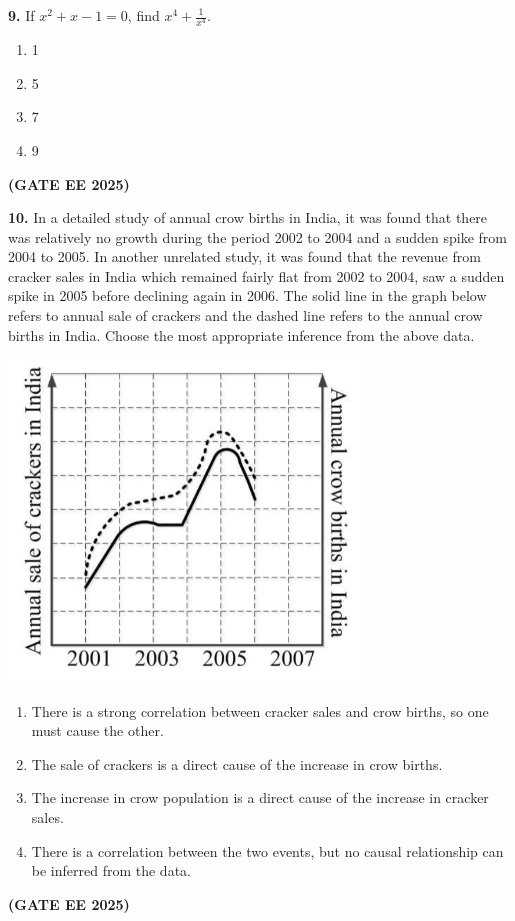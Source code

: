 \documentclass[journal,12pt,onecolumn]{IEEEtran}
\newcommand{\brak}[1]{(#1)}
\begin{document}
\noindent\textbf{9.} If $x^{2}+x-1=0$, find $x^4+\frac{1}{x^4}$.
\begin{enumerate}
    \item 1
    \item 5
    \item 7
    \item 9
\end{enumerate}
\hfill \textbf{\brak{GATE EE 2025}}

\noindent\textbf{10.} In a detailed study of annual crow births in India, it was found that there was relatively no growth during the period 2002 to 2004 and a sudden spike from 2004 to 2005. In another unrelated study, it was found that the revenue from cracker sales in India which remained fairly flat from 2002 to 2004, saw a sudden spike in 2005 before declining again in 2006. The solid line in the graph below refers to annual sale of crackers and the dashed line refers to the annual crow births in India. Choose the most appropriate inference from the above data.


\begin{center}
\includegraphics[width=0.7\textwidth]{figs/10.png}
\end{center}

\normalsize

\begin{enumerate}
    \item There is a strong correlation between cracker sales and crow births, so one must cause the other.
    \item The sale of crackers is a direct cause of the increase in crow births.
    \item The increase in crow population is a direct cause of the increase in cracker sales.
    \item There is a correlation between the two events, but no causal relationship can be inferred from the data.
\end{enumerate}
\hfill \textbf{\brak{GATE EE 2025}}
\end{document}
